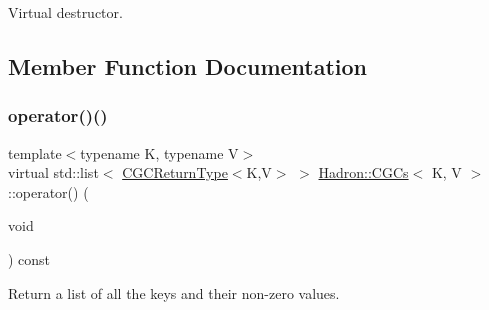 Virtual destructor. 



\subsection{Member Function Documentation}
\mbox{\label{classHadron_1_1CGCs_ac709374b31c0319e82028b9d7c23e993}} 
\subsubsection{\texorpdfstring{operator()()}{operator()()}\hspace{0.1cm}{\footnotesize\ttfamily [1/6]}}
{\footnotesize\ttfamily template$<$typename K, typename V$>$ \\
virtual std\+::list$<$ \mbox{\hyperlink{structHadron_1_1CGCReturnType}{C\+G\+C\+Return\+Type}}$<$K,V$>$ $>$ \mbox{\hyperlink{classHadron_1_1CGCs}{Hadron\+::\+C\+G\+Cs}}$<$ K, V $>$\+::operator() (\begin{DoxyParamCaption}\item[{void}]{ }\end{DoxyParamCaption}) const\hspace{0.3cm}{\ttfamily [pure virtual]}}



Return a list of all the keys and their non-\/zero values. 



